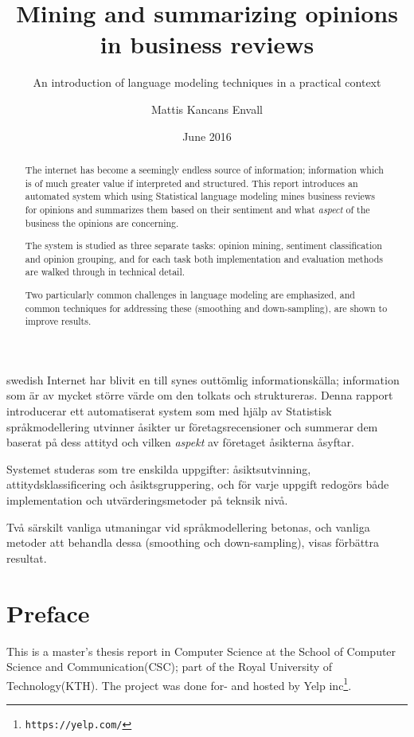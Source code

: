 \documentclass[a4paper,11pt]{kth-mag}
\title{Mining and summarizing opinions in business reviews}
\subtitle{An introduction of language modeling techniques in a practical context}
\author{Mattis Kancans Envall}
\date{June 2016}
\begin{document}
\frontmatter
\pagestyle{empty}
\removepagenumbers
\maketitle
{}
\begin{abstract}
  The internet has become a seemingly endless source of information;
  information which is of much greater value if interpreted and structured.
  This report introduces an automated system which using Statistical language modeling
  mines business reviews for opinions and summarizes them
  based on their sentiment and what \emph{aspect} of the business the opinions are concerning.
  
  The system is studied as three separate tasks: opinion mining, sentiment classification and opinion grouping,
  and for each task both implementation and evaluation methods are walked through in technical detail.

  Two particularly common challenges in language modeling are emphasized, and common techniques for addressing these
  (smoothing and down-sampling), are shown to improve results.
\end{abstract}


\clearpage
\begin{foreignabstract}{swedish}
  Internet har blivit en till synes outtömlig informationskälla; information som är av mycket större
  värde om den tolkats och struktureras.
  Denna rapport introducerar ett automatiserat system som med hjälp av Statistisk språkmodellering
  utvinner åsikter ur företagsrecensioner och summerar dem
  baserat på dess attityd och vilken \emph{aspekt} av företaget åsikterna åsyftar.

  Systemet studeras som tre enskilda uppgifter: åsiktsutvinning, attitydsklassificering och åsiktsgruppering,
  och för varje uppgift redogörs både implementation och utvärderingsmetoder på teknsik nivå.

  Två särskilt vanliga utmaningar vid språkmodellering betonas, och vanliga metoder att behandla dessa (smoothing och down-sampling), visas förbättra resultat.
\end{foreignabstract}
\clearpage

\section*{Preface}
This is a master's thesis report in Computer Science at the School of Computer Science and Communication(CSC); part of the Royal University of Technology(KTH). The project was done for- and hosted by Yelp inc\footnote{\texttt{https://yelp.com/}}.
\end{document}
